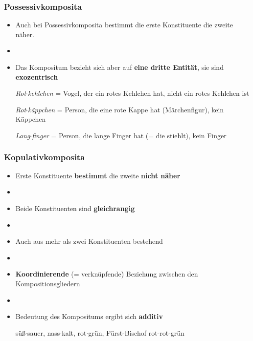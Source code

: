 

\begin{frame}
\frametitle{Possessivkomposita}

\begin{itemize}
	\item Auch bei Possessivkomposita bestimmt die erste Konstituente die zweite näher.
	\item[]
	\item Das Kompositum bezieht sich aber auf \textbf{eine dritte Entität}, sie sind \textbf{exozentrisch}
	
	\ea \emph{Rot$\cdot$kehlchen} = Vogel, der ein rotes Kehlchen hat, nicht ein rotes Kehlchen ist
	\z
	
	\ea \emph{Rot$\cdot$käppchen} = Person, die eine rote Kappe hat (Märchenfigur), kein Käppchen
	\z
	
	\ea \emph{Lang$\cdot$finger} = Person, die lange Finger hat (= die stiehlt), kein Finger
	\z
	
\end{itemize}


\end{frame}




\begin{frame}
\frametitle{Kopulativkomposita}

\begin{itemize}
	\item Erste Konstituente \textbf{bestimmt} die zweite \textbf{nicht näher}
	\item[]
	\item Beide Konstituenten sind \textbf{gleichrangig}
	\item[]
	\item Auch aus mehr als zwei Konstituenten bestehend
	\item[]
	\item \textbf{Koordinierende} (= verknüpfende) Beziehung zwischen den Kompositionsgliedern
	\item[]
	\item Bedeutung des Kompositums ergibt sich \textbf{additiv}
	
	\eal 
	\ex süß$\cdot$sauer, nass$\cdot$kalt, rot$\cdot$grün, Fürst-Bischof
	\ex rot-rot-grün
	\zl
	
\end{itemize}


\end{frame}


